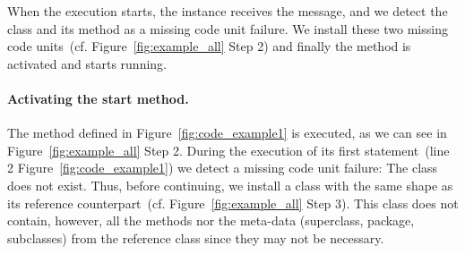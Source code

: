 When the execution starts, the  instance receives the  message, and we detect the  class and its  method as a missing code unit failure. We install these two missing code units~(cf. Figure~\ref{fig:example_all} Step 2) and finally the  method is activated and starts running.


\paragraph{Activating the start method.}
The method  defined in Figure~\ref{fig:code_example1} is executed, as we can see in Figure~\ref{fig:example_all} Step 2. During the execution of its first statement~(line 2 Figure~\ref{fig:code_example1}) we detect a missing code unit failure: The  class does not exist. Thus, before continuing, we install a  class with the same shape as its reference counterpart~(cf. Figure~\ref{fig:example_all} Step 3). This class does not contain, however, all the methods nor the meta-data (\eg superclass, package, subclasses) from the reference class since they may not be necessary.




